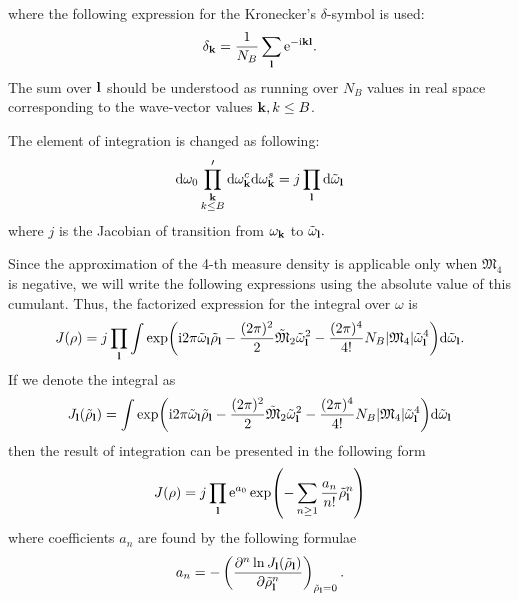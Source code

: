 where the following expression for the Kronecker's $\delta$-symbol is used:
\begin{equation}
	\delta_{\vb k} = \frac{1}{N_B}\sum_{\vb l} {\rm e}^{-{\rm i} \vb k \vb l}.
\end{equation}
The sum over $\vb l$ should be understood as running over $N_B$ values in real space corresponding to the wave-vector values $\vb k, k\leq B$.

The element of integration is changed as following:
\begin{equation}
	{\rm d} \omega_0 \prod'_{\substack{\vb k \\ k\leq B}} {\rm d} \omega_{\vb k}^c {\rm d}\omega_{\vb k}^s = j \prod_{\vb l} {\rm d} \tilde{\omega}_{\vb l}
\end{equation}
where $j$ is the Jacobian of transition from $\omega_{\vb k}$ to $\tilde{\omega}_{\vb l}.$

Since the approximation of the 4-th measure density is applicable only when $\mathfrak{M_4}$ is negative, we will write the following expressions using the absolute value of this cumulant. 
Thus, the factorized expression for the integral over $\omega$ is
\begin{equation}
	J(\rho) = j\prod_{\vb l} 
	\int \exp({\rm i}2\pi \tilde{\omega}_{\vb l} \tilde{\rho}_{\vb l} - \frac{(2\pi)^2}{2} \tilde{\mathfrak{M}}_2 \tilde{\omega}_{\vb l}^2 - \frac{(2\pi)^4}{4!}N_B \abs{\mathfrak{M}_4} \tilde{\omega}_{\vb l}^4)
	{\rm d}\tilde{\omega}_{\vb l}.
\end{equation}
If we denote the integral as
\begin{equation}
	J_{\vb l}(\tilde{\rho}_{\vb l}) = \int \exp({\rm i}2\pi \tilde{\omega}_{\vb l} \tilde{\rho}_{\vb l} 
	- \frac{(2\pi)^2}{2} \tilde{\mathfrak{M}}_2 \tilde{\omega}_{\vb l}^2 - \frac{(2\pi)^4}{4!}N_B \abs{\mathfrak{M}_4} \tilde{\omega}_{\vb l}^4)
	{\rm d}\tilde{\omega}_{\vb l}
\end{equation}
then the result of integration can be presented in the following form
\begin{equation}
	J(\rho) = j\prod_{\vb l}{\rm e}^{a_0} \exp(-\sum_{n\geq 1} \frac{a_n}{n!}\tilde{\rho}_{\vb l}^n)
\end{equation}
where coefficients $a_n$ are found by the following formulae
\begin{equation}
	a_n = - \left(\frac{\partial^n \ln J_{\vb l}(\tilde{\rho}_{\vb l})}{\partial \tilde{\rho}_{\vb l}^n}\right)_{\tilde{\rho}_{\vb l}=0}.
\end{equation}

